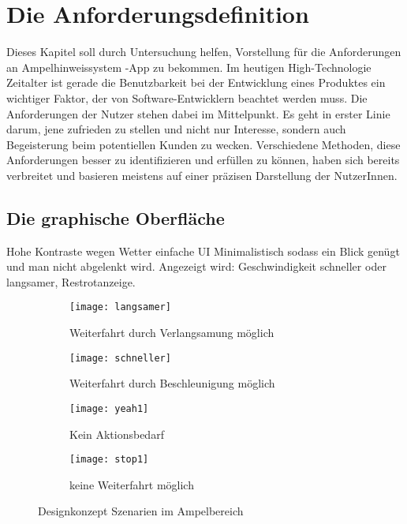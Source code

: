 \chapter{Die Anforderungsdefinition}
Dieses Kapitel soll durch Untersuchung helfen, Vorstellung für die Anforderungen an Ampelhinweissystem -App zu bekommen. 
Im heutigen High-Technologie Zeitalter ist gerade die Benutzbarkeit bei der Entwicklung eines Produktes ein wichtiger Faktor, der von Software-Entwicklern beachtet werden muss. Die Anforderungen der Nutzer stehen dabei im Mittelpunkt. Es geht in erster Linie darum, jene zufrieden zu stellen und nicht nur Interesse, sondern auch Begeisterung beim potentiellen Kunden zu wecken. Verschiedene Methoden, diese Anforderungen besser zu identifizieren und erfüllen zu können, haben sich bereits verbreitet und basieren meistens auf einer präzisen Darstellung der NutzerInnen.
\section{Die graphische Oberfläche}

Hohe Kontraste wegen Wetter
einfache UI 
Minimalistisch sodass ein Blick genügt und man nicht abgelenkt wird.
Angezeigt wird: Geschwindigkeit schneller oder langsamer, 
Restrotanzeige.
\begin{figure}[H]
        \centering
        \begin{subfigure}[t]{0.36\textwidth}
                \texttt{[image: langsamer]}
                \caption[Systemzustand a]{Weiterfahrt durch Verlangsamung möglich}
                \label{fig:langsamer}
        \end{subfigure}
        \hfill
        \begin{subfigure}[t]{0.36\textwidth}
                \texttt{[image: schneller]}
                \caption[Systemzustand b]{Weiterfahrt durch Beschleunigung möglich}
                \label{fig:schneller}
        \end{subfigure}
        \begin{subfigure}[t]{0.36\textwidth}
                \texttt{[image: yeah1]}
                \caption[Systemzustand c]{Kein Aktionsbedarf}
                \label{fig:langsamer}
        \end{subfigure}
        \hfill 
        \begin{subfigure}[t]{0.36\textwidth}
                \texttt{[image: stop1]}
                \caption[Systemzustand s]{keine Weiterfahrt möglich}
                \label{fig:schneller}
        \end{subfigure}
        \caption[Systemzustände im Ampelbereich]{Designkonzept Szenarien im Ampelbereich}
        \label{fig:szenario_mockup}
\end{figure} 

